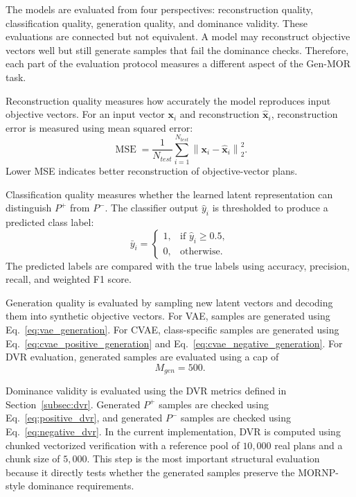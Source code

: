The models are evaluated from four perspectives: reconstruction quality, classification quality, generation quality, and dominance validity. These evaluations are connected but not equivalent. A model may reconstruct objective vectors well but still generate samples that fail the dominance checks. Therefore, each part of the evaluation protocol measures a different aspect of the Gen-MOR task.

Reconstruction quality measures how accurately the model reproduces input objective vectors. For an input vector $\mathbf{x}_i$ and reconstruction $\hat{\mathbf{x}}_i$, reconstruction error is measured using mean squared error:
\begin{equation}
    \operatorname{MSE}
    =
    \frac{1}{N_{test}}
    \sum_{i=1}^{N_{test}}
    \left\|
        \mathbf{x}_i - \hat{\mathbf{x}}_i
    \right\|_2^2.
    \label{eq:experimental_mse}
\end{equation}
Lower MSE indicates better reconstruction of objective-vector plans.

Classification quality measures whether the learned latent representation can distinguish $P^{+}$ from $P^{-}$. The classifier output $\hat{y}_i$ is thresholded to produce a predicted class label:
\begin{equation}
    \bar{y}_i =
    \begin{cases}
        1, & \text{if } \hat{y}_i \geq 0.5,\\
        0, & \text{otherwise}.
    \end{cases}
    \label{eq:classification_threshold}
\end{equation}
The predicted labels are compared with the true labels using accuracy, precision, recall, and weighted F1 score.

Generation quality is evaluated by sampling new latent vectors and decoding them into synthetic objective vectors. For VAE, samples are generated using Eq.~\eqref{eq:vae_generation}. For CVAE, class-specific samples are generated using Eq.~\eqref{eq:cvae_positive_generation} and Eq.~\eqref{eq:cvae_negative_generation}. For DVR evaluation, generated samples are evaluated using a cap of
\begin{equation}
    M_{gen} = 500.
    \label{eq:num_generated_samples}
\end{equation}

Dominance validity is evaluated using the DVR metrics defined in Section~\ref{subsec:dvr}. Generated $P^{+}$ samples are checked using Eq.~\eqref{eq:positive_dvr}, and generated $P^{-}$ samples are checked using Eq.~\eqref{eq:negative_dvr}. In the current implementation, DVR is computed using chunked vectorized verification with a reference pool of $10{,}000$ real plans and a chunk size of $5{,}000$. This step is the most important structural evaluation because it directly tests whether the generated samples preserve the MORNP-style dominance requirements.

